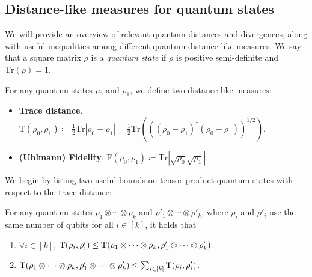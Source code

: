 \documentclass[10pt,a4paper]{article}
\numberwithin{equation}{section}
\numberwithin{figure}{section}
\DeclarePairedDelimiter\rbra{\lparen}{\rparen}
\newcommand{\Tr}{\mathrm{Tr}}
\newcommand{\td}{\mathrm{T}}
\newcommand{\F}{\mathrm{F}}
\begin{document}
\subsection{Distance-like measures for quantum states}

We will provide an overview of relevant quantum distances and divergences, along with useful inequalities among different quantum distance-like measures. We say that a square matrix $\rho$ is a \textit{quantum state} if $\rho$ is positive semi-definite and $\Tr(\rho)=1$.

\begin{definition}
    \label{def:quantum-distances}
    For any quantum states $\rho_0$ and $\rho_1$, we define two distance-like measures: 
    \begin{itemize}
        \item \textnormal{\textbf{Trace distance}.} $\td(\rho_0,\rho_1)\coloneqq\frac{1}{2}\Tr|\rho_0-\rho_1|=\frac{1}{2}\Tr(((\rho_0-\rho_1)^\dagger(\rho_0-\rho_1))^{1/2}).$
        \item \textnormal{\textbf{(Uhlmann) Fidelity}.} $\F(\rho_0,\rho_1)\coloneqq\Tr|\sqrt{\rho_0}\sqrt{\rho_1}|$.
    \end{itemize}
\end{definition}

We begin by listing two useful bounds on tensor-product quantum states with respect to the trace distance: 

\begin{lemma}
    \label{lemma:trace-distance-product-states}
    For any quantum states $\rho_1 \otimes \cdots \otimes \rho_k$ and $\rho'_1 \otimes \cdots \otimes \rho'_k$, where $\rho_i$ and $\rho'_i$ use the same number of qubits for all $i\in[k]$, it holds that
    \begin{enumerate}[label={\upshape(\arabic*)}, itemsep=0.33em, topsep=0.33em, parsep=0.33em]
        \item $\forall i \in [k]$, $\td\rbra*{ \rho_i, \rho'_i } \leq \td\rbra*{\rho_1 \otimes \cdots \otimes \rho_k, \rho'_1 \otimes \cdots \otimes \rho'_k}$.
        \item $\td\rbra*{\rho_1 \otimes \cdots \otimes \rho_k, \rho'_1 \otimes \cdots \otimes \rho'_k} \leq \sum_{i\in [k]} \td \rbra*{ \rho_i, \rho'_i }$. 
    \end{enumerate}
\end{lemma}
\end{document}
